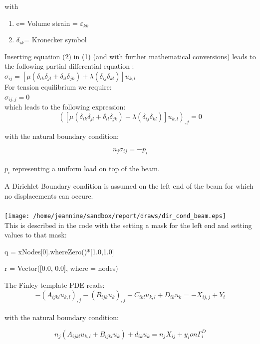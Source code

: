 with

\begin{enumerate}
\item e= Volume strain = $\varepsilon_{kk}$
\item $\delta_{ik}$= Kronecker symbol
\end{enumerate}
Inserting equation (2) in (1) (and with further mathematical conversions)
leads to the following partial differential equation :\\


$\sigma_{ij}=\left[\mu\left(\delta_{ik}\delta_{jl}+\delta_{il}\delta_{jk}\right)+\lambda\left(\delta_{ij}\delta_{kl}\right)\right]u_{k,l}$\\


For tension equilibrium we require:\\


$\sigma_{ij,j}=0$\\


which leads to the following expression:\\


\[
\left(\left[\mu\left(\delta_{ik}\delta_{jl}+\delta_{il}\delta_{jk}\right)+\lambda\left(\delta_{ij}\delta_{kl}\right)\right]u_{k,l}\right)_{,j}=0\]


with the natural boundary condition:

\[
n_{j}\sigma_{ij}=-p_{i}\]
\\
$p_{i}$ representing a uniform load on top of the beam.

A Dirichlet Boundary condition is assumed on the left end of the beam
for which no displacements can occure.\\
\\
\texttt{[image: /home/jeannine/sandbox/report/draws/dir\_cond\_beam.eps]}\\
This is described in the code with the setting a mask for the left
end and setting values to that mask:

\begin{python}
q = xNodes{[}0{]}.whereZero(){*}{[}1.0,1.0{]}

r = Vector({[}0.0, 0.0{]}, where = nodes)
\end{python}
The Finley template PDE reads:\\


\[
-(A_{ijkl}u_{k,l})_{,j}-(B_{ijk}u_{k})_{,j}+C_{ikl}u_{k,l}+D_{ik}u_{k}=-X_{ij,j}+Y_{i}\]
\\
with the natural boundary condition:

\[
n_{j}(A_{ijkl}u_{k,l}+B_{ijkl}u_{k})+d_{ik}u_{k}=n_{j}X_{ij}+y_{i}on\Gamma_{i}^{D}\]



